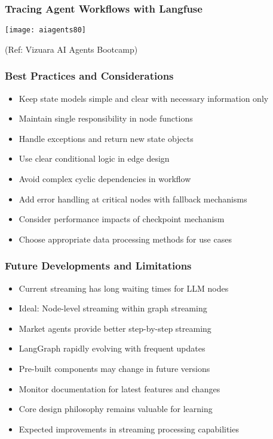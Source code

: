 \begin{frame}[fragile]\frametitle{Tracing Agent Workflows with Langfuse}

        \begin{center}

        \texttt{[image: aiagents80]}
		
		{\tiny (Ref: Vizuara AI Agents Bootcamp)}
				
        \end{center}    

\end{frame}


\begin{frame}[fragile]\frametitle{Best Practices and Considerations}
      \begin{itemize}
        \item Keep state models simple and clear with necessary information only
        \item Maintain single responsibility in node functions
        \item Handle exceptions and return new state objects
        \item Use clear conditional logic in edge design
        \item Avoid complex cyclic dependencies in workflow
        \item Add error handling at critical nodes with fallback mechanisms
        \item Consider performance impacts of checkpoint mechanism
        \item Choose appropriate data processing methods for use cases
      \end{itemize}
\end{frame}

\begin{frame}[fragile]\frametitle{Future Developments and Limitations}
      \begin{itemize}
        \item Current streaming has long waiting times for LLM nodes
        \item Ideal: Node-level streaming within graph streaming
        \item Market agents provide better step-by-step streaming
        \item LangGraph rapidly evolving with frequent updates
        \item Pre-built components may change in future versions
        \item Monitor documentation for latest features and changes
        \item Core design philosophy remains valuable for learning
        \item Expected improvements in streaming processing capabilities
      \end{itemize}
\end{frame}

